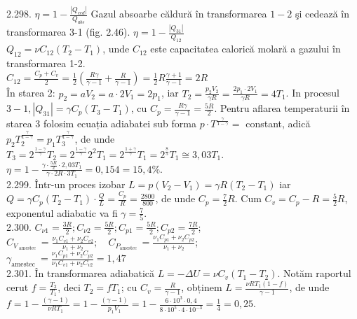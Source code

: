 2.298. $\eta=1-\frac{\left|Q_{c e d}\right|}{Q_{a b s}}$ Gazul absoarbe căldură în transformarea $1-2$ şi cedează în transformarea 3-1 (fig. 2.46). $\eta=1-\frac{\left|Q_{31}\right|}{Q_{12}}$\\ $Q_{12}=\nu C_{12}\left(T_{2}-T_{1}\right)$, unde $C_{12}$ este capacitatea calorică molară a gazului în transformarea 1-2.\\ $C_{12}=\frac{C_{p}+C_{v}}{2}=\frac{1}{2}\left(\frac{R \gamma}{\gamma-1}+\frac{R}{\gamma-1}\right)=\frac{1}{2} R \frac{\gamma+1}{\gamma-1}=2 R$\\ În starea 2: $p_{2}=a V_{2}=a \cdot 2 V_{1}=2 p_{1}$, iar $T_{2}=\frac{p_{2} V_{2}}{\gamma R}=\frac{2 p_{1} \cdot 2 V_{1}}{\gamma R}=4 T_{1}$. In procesul $3-1,\left|Q_{31}\right|=\gamma C_{p}\left(T_{3}-T_{1}\right)$, cu $C_{p}=\frac{R \gamma}{\gamma-1}=\frac{5 R}{2}$. Pentru aflarea temperaturii în starea 3 folosim ecuația adiabatei sub forma $p \cdot T^{\frac{\gamma}{1-\gamma}}=$ constant, adică $p_{2} T_{2}^{\frac{\gamma}{1-\gamma}}=p_{1} T_{3}^{\frac{\gamma}{1-\gamma}}$, de unde\\ $T_{3}=2^{\frac{1-\gamma}{\gamma}} T_{2}=2^{\frac{1-\gamma}{\gamma}} 2^{2} T_{1}=2^{\frac{1+\gamma}{\gamma}} T_{1}=2^{\frac{8}{5}} T_{1} \cong 3,03 T_{1}$. \\ $\eta=1-\frac{\gamma \cdot \frac{5 R}{2} \cdot 2,03 T_{1}}{\gamma \cdot 2 R \cdot 3 T_{1}}=0,154=15,4 \%$.\\

2.299. Într-un proces izobar $L=p\left(V_{2}-V_{1}\right)=\gamma R\left(T_{2}-T_{1}\right)$ iar $Q=\gamma C_{p}\left(T_{2}-T_{1}\right) \cdot \frac{Q}{L}=\frac{C_{p}}{R}=\frac{2800}{800}$, de unde $C_{p}=\frac{7}{2} R$. Cum $C_{v}=C_{p}-R=\frac{5}{2} R$, exponentul adiabatic va fi $\gamma=\frac{7}{5}$.\\

2.300. $C_{\nu 1}=\frac{3 R}{2} ; C_{\nu 2}=\frac{5 R}{2} ; C_{p 1}=\frac{5 R}{2} ; C_{p 2}=\frac{7 R}{2}$;\\ $C_{V_{\text { amestec }}}=\frac{\nu_{1} C_{v 1}+\nu_{2} C_{v 2}}{\nu_{1}+\nu_{2}} ; \quad C_{P_{\text {amestec }}}=\frac{\nu_{1} C_{p 1}+\nu_{2} C_{p 2}}{\nu_{1}+\nu_{2}}$; \\ $\gamma_{\text {amestec }}=\frac{\nu_{1} C_{p 1}+\nu_{2} C_{p 2}}{\nu_{1} C_{v 1}+\nu_{2} C_{v 2}}=1,47$\\

2.301. În transformarea adiabatică $L=-\Delta U=\nu C_{v}\left(T_{1}-T_{2}\right)$. Notăm raportul cerut $f=\frac{T_{2}}{T_{1}}$, deci $T_{2}=f T_{1}$; cu $C_{v}=\frac{R}{\gamma-1}$, obținem $L=\frac{\nu R T_{1}(1-f)}{\gamma-1}$, de unde\\ $f=1-\frac{(\gamma-1)}{\nu R T_{1}}=1-\frac{(\gamma-1)}{p_{1} V_{1}}=1-\frac{6 \cdot 10^{3} \cdot 0,4}{8 \cdot 10^{5} \cdot 4 \cdot 10^{-3}}=\frac{1}{4}=0,25$.\\

